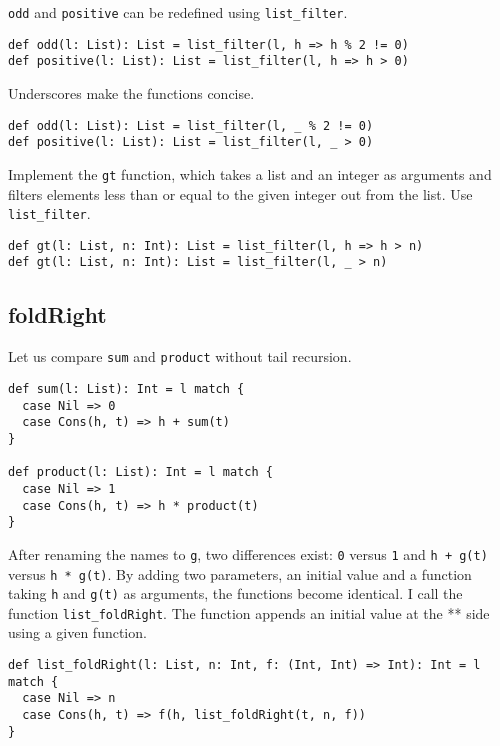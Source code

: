 \verb!odd! and \verb!positive! can be redefined using \verb!list_filter!.

\begin{verbatim}
def odd(l: List): List = list_filter(l, h => h % 2 != 0)
def positive(l: List): List = list_filter(l, h => h > 0)
\end{verbatim}

Underscores make the functions concise.

\begin{verbatim}
def odd(l: List): List = list_filter(l, _ % 2 != 0)
def positive(l: List): List = list_filter(l, _ > 0)
\end{verbatim}

Implement the \verb!gt! function, which takes a list and an integer as arguments
and filters elements less than or equal to the given integer out from the list.
Use \verb!list_filter!.

\begin{verbatim}
def gt(l: List, n: Int): List = list_filter(l, h => h > n)
def gt(l: List, n: Int): List = list_filter(l, _ > n)
\end{verbatim}

\subsection{foldRight}

Let us compare \verb!sum! and \verb!product! without tail recursion.

\begin{verbatim}
def sum(l: List): Int = l match {
  case Nil => 0
  case Cons(h, t) => h + sum(t)
}

def product(l: List): Int = l match {
  case Nil => 1
  case Cons(h, t) => h * product(t)
}
\end{verbatim}

After renaming the names to \verb!g!, two differences exist: \verb!0! versus
\verb!1! and \verb!h + g(t)! versus \verb!h * g(t)!. By adding two parameters, an
initial value and a function taking \verb!h! and \verb!g(t)! as arguments, the
functions become identical. I call the function \verb!list_foldRight!. The
function appends an initial value at the ** side using a given function.

\begin{verbatim}
def list_foldRight(l: List, n: Int, f: (Int, Int) => Int): Int = l match {
  case Nil => n
  case Cons(h, t) => f(h, list_foldRight(t, n, f))
}
\end{verbatim}

